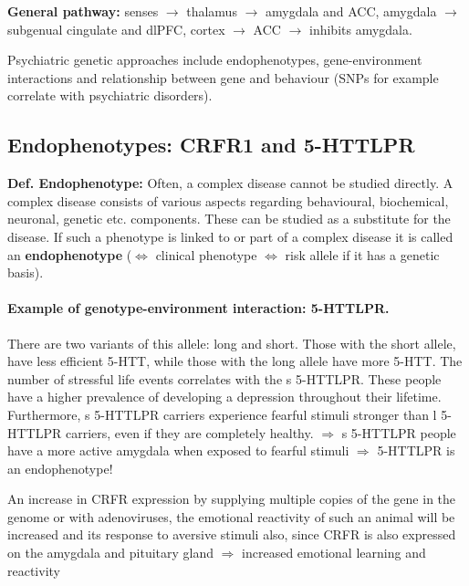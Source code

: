 \documentclass[twosided, a4paper, pt11]{article}
\begin{document}
	
	
	\textbf{General pathway:} senses $\rightarrow$ thalamus $\rightarrow$ amygdala and ACC, amygdala $\rightarrow$ subgenual cingulate and dlPFC, cortex $\rightarrow$ ACC $\rightarrow$ inhibits amygdala.\newline
	
	Psychiatric genetic approaches include endophenotypes, gene-environment interactions and relationship between gene and behaviour (SNPs for example correlate with psychiatric disorders). 
	
	\subsection{Endophenotypes: CRFR1 and 5-HTTLPR}
	\textbf{Def. Endophenotype: }Often, a complex disease cannot be studied directly. A complex disease consists of various aspects regarding behavioural, biochemical, neuronal, genetic etc. components. These can be studied as a substitute for the disease. If such a phenotype is linked to or part of a complex disease it is called an \textbf{endophenotype} ($\Leftrightarrow$ clinical phenotype $\Leftrightarrow$ risk allele if it has a genetic basis).
	\paragraph{Example of genotype-environment interaction: 5-HTTLPR.} There are two variants of this allele: long and short. Those with the short allele, have less efficient 5-HTT, while those with the long allele have more 5-HTT. The number of stressful life events correlates with the s 5-HTTLPR. These people have a higher prevalence of developing a depression throughout their lifetime. Furthermore, s 5-HTTLPR carriers experience fearful stimuli stronger than l 5-HTTLPR carriers, even if they are completely healthy. $\Rightarrow$ s 5-HTTLPR people have a more active amygdala when exposed to fearful stimuli $\Rightarrow$ 5-HTTLPR is an endophenotype!\newline
	
	An increase in CRFR expression by supplying multiple copies of the gene in the genome or with adenoviruses, the emotional reactivity of such an animal will be increased and its response to aversive stimuli also, since CRFR is also expressed on the amygdala and pituitary gland $\Rightarrow$ increased emotional learning and reactivity
	
\end{document}
